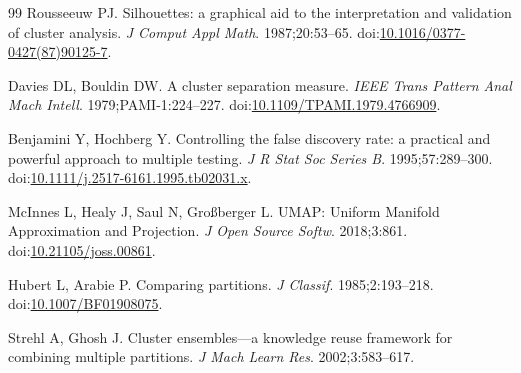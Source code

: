 \documentclass[11pt]{article}
\begin{document}
\begin{thebibliography}{99}
Rousseeuw PJ. Silhouettes: a graphical aid to the interpretation and validation of cluster analysis. \textit{J Comput Appl Math}. 1987;20:53--65. doi:\href{https://doi.org/10.1016/0377-0427(87)90125-7}{10.1016/0377-0427(87)90125-7}.

Davies DL, Bouldin DW. A cluster separation measure. \textit{IEEE Trans Pattern Anal Mach Intell}. 1979;PAMI-1:224--227. doi:\href{https://doi.org/10.1109/TPAMI.1979.4766909}{10.1109/TPAMI.1979.4766909}.

Benjamini Y, Hochberg Y. Controlling the false discovery rate: a practical and powerful approach to multiple testing. \textit{J R Stat Soc Series B}. 1995;57:289--300. doi:\href{https://doi.org/10.1111/j.2517-6161.1995.tb02031.x}{10.1111/j.2517-6161.1995.tb02031.x}.

McInnes L, Healy J, Saul N, Gro\ss berger L. UMAP: Uniform Manifold Approximation and Projection. \textit{J Open Source Softw}. 2018;3:861. doi:\href{https://doi.org/10.21105/joss.00861}{10.21105/joss.00861}.

Hubert L, Arabie P. Comparing partitions. \textit{J Classif}. 1985;2:193--218. doi:\href{https://doi.org/10.1007/BF01908075}{10.1007/BF01908075}.

Strehl A, Ghosh J. Cluster ensembles---a knowledge reuse framework for combining multiple partitions. \textit{J Mach Learn Res}. 2002;3:583--617.

\end{thebibliography}
\end{document}
